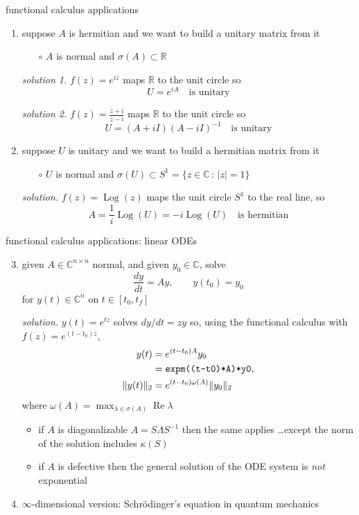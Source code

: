 \documentclass[10pt,hyperref]{beamer}
\newcommand{\CC}{\mathbb{C}}
\newcommand{\RR}{\mathbb{R}}
\begin{document}
\begin{frame}{functional calculus applications}

\begin{enumerate}
\item suppose $A$ is hermitian and we want to build a unitary matrix from it
    \begin{itemize}
    \item[$\circ$] $A$ is normal and $\sigma(A) \subset \RR$
    \end{itemize}

\medskip
\emph{solution 1.} $f(z) = e^{iz}$ maps $\RR$ to the unit circle so
    $$U = e^{iA} \quad \text{is unitary}$$

\emph{solution 2.} $\displaystyle f(z) = \frac{z+i}{z-i}$ maps $\RR$ to the unit circle so
    $$U = (A+iI)(A-iI)^{-1} \quad \text{is unitary}$$

\medskip
\item suppose $U$ is unitary and we want to build a hermitian matrix from it
    \begin{itemize}
    \item[$\circ$] $U$ is normal and $\sigma(U) \subset S^1 = \{z\in \CC\,:\, |z|=1\}$
    \end{itemize}
\newcommand{\Log}{\operatorname{Log}}

\medskip
\emph{solution.} $f(z) = \Log(z)$ maps the unit circle $S^1$ to the real line, so
    $$A = \frac{1}{i} \Log(U) = -i \Log(U) \quad \text{is hermitian}$$
\end{enumerate}
\end{frame}


\begin{frame}{functional calculus applications: linear ODEs}

\begin{enumerate}
\setcounter{enumi}{2}
\item given $A \in \CC^{n\times n}$ normal, and given $y_0\in\CC$, solve
    $$\frac{dy}{dt} = A y, \qquad y(t_0) = y_0$$
for $y(t) \in \CC^n$ on $t\in [t_0,t_f]$ 

\medskip
\emph{solution.} $y(t) = e^{tz}$ solves $dy/dt=zy$ so, using the functional calculus with $f(z) = e^{(t-t_0)z}$,
\begin{align*}
    y(t) &= e^{(t-t_0)A} y_0 \\
         &= \text{\texttt{expm((t-t0)*A)*y0}}, \\
  \|y(t)\|_2 &= e^{(t-t_0)\omega(A)}\|y_0\|_2
\end{align*}
where $\omega(A) = \max_{\lambda\in\sigma(A)} \operatorname{Re} \lambda$
\begin{itemize}
\item if $A$ is diagonalizable $A=S \Lambda S^{-1}$ then the same applies \dots except the norm of the solution includes $\kappa(S)$
\item if $A$ is defective then the general solution of the ODE system is \emph{not} exponential
\end{itemize}
\item $\infty$-dimensional version: Schr\"odinger's equation in quantum mechanics
\end{enumerate}
\end{frame}
\end{document}
